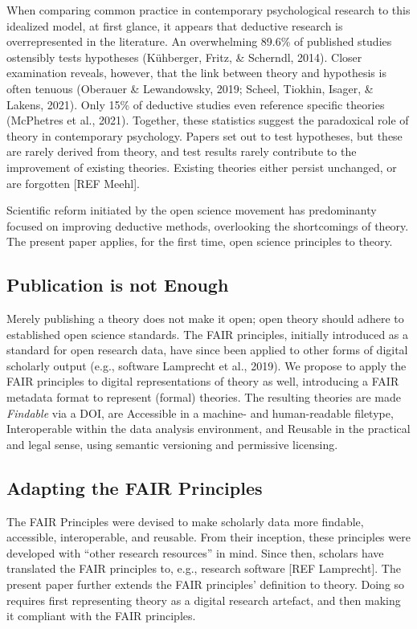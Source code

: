\documentclass[
  man]{apa6}
\begin{document}
When comparing common practice in contemporary psychological research to this idealized model, at first glance,
it appears that deductive research is overrepresented in the literature.
An overwhelming 89.6\% of published studies ostensibly tests hypotheses (Kühberger, Fritz, \& Scherndl, 2014).
Closer examination reveals, however, that the link between theory and hypothesis is often tenuous (Oberauer \& Lewandowsky, 2019; Scheel, Tiokhin, Isager, \& Lakens, 2021).
Only 15\% of deductive studies even reference specific theories (McPhetres et al., 2021).
Together, these statistics suggest the paradoxical role of theory in contemporary psychology.
Papers set out to test hypotheses, but these are rarely derived from theory, and test results rarely contribute to the improvement of existing theories.
Existing theories either persist unchanged, or are forgotten {[}REF Meehl{]}.

Scientific reform initiated by the open science movement has predominanty focused on improving deductive methods, overlooking the shortcomings of theory.
The present paper applies, for the first time, open science principles to theory.

\subsection{Publication is not Enough}\label{publication-is-not-enough}

Merely publishing a theory does not make it open;
open theory should adhere to established open science standards.
The FAIR principles, initially introduced as a standard for open research data, have since been applied to other forms of digital scholarly output (e.g., software Lamprecht et al., 2019).
We propose to apply the FAIR principles to digital representations of theory as well,
introducing a FAIR metadata format to represent (formal) theories.
The resulting theories are made \emph{Findable} via a DOI,
are Accessible in a machine- and human-readable filetype,
Interoperable within the data analysis environment,
and Reusable in the practical and legal sense, using semantic versioning and permissive licensing.

\subsection{Adapting the FAIR Principles}\label{adapting-the-fair-principles}

The FAIR Principles were devised to make scholarly data more findable, accessible, interoperable, and reusable. From their inception, these principles were developed with ``other research resources'' in mind. Since then, scholars have translated the FAIR principles to, e.g., research software {[}REF Lamprecht{]}. The present paper further extends the FAIR principles' definition to theory. Doing so requires first representing theory as a digital research artefact, and then making it compliant with the FAIR principles.
\end{document}
